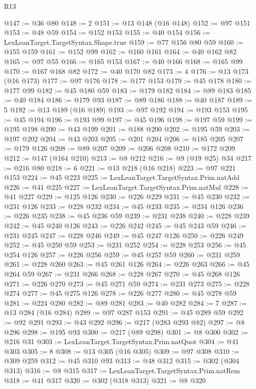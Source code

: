 \begin{lexlean}{R13}
\begin{coremodule}
@147 := @36 @80
@148 := 2
@151 := @13 @148 (@16 @148)
@152 := @97 @151
@153 := @48 @59
@154 := @152 @153
@155 := @40 @154
@156 := LexLeanTarget.TargetSyntax.Shape.true
@159 := @77 @156 @80 @59
@160 := @155 @159
@161 := @152 @99
@162 := @160 @161
@164 := @40 @162 @82
@165 := @97 @55
@166 := @165 @153
@167 := @40 @166
@168 := @165 @99
@170 := @167 @168 @82
@172 := @40 @170 @82
@173 := 4
@176 := @13 @173 (@16 @173)
@177 := @97 @176
@178 := @177 @153
@179 := @45 @178
@180 := @177 @99
@182 := @45 @180 @59
@183 := @179 @182
@184 := @89 @183
@185 := @40 @184
@186 := @179 @93
@187 := @89 @186
@188 := @40 @187
@189 := 5
@192 := @13 @189 (@16 @189)
@193 := @97 @192
@194 := @193 @153
@195 := @45 @194
@196 := @193 @99
@197 := @45 @196
@198 := @197 @59
@199 := @195 @198
@200 := @43 @199
@201 := @188 @200
@202 := @195 @59
@203 := @197 @202
@204 := @43 @203
@205 := @201 @204
@206 := @185 @205
@207 := @179 @126
@208 := @89 @207
@209 := @206 @208
@210 := @172 @209
@212 := @147 (@164 @210)
@213 := @8 @212
@216 := @9 (@19 @25) @34
@217 := @216 @80
@218 := 6
@221 := @13 @218 (@16 @218)
@223 := @97 @221 @153
@224 := @45 @223
@225 := LexLeanTarget.TargetSyntax.Prim.natAdd
@226 := @41 @225
@227 := LexLeanTarget.TargetSyntax.Prim.natMul
@228 := @41 @227
@229 := @125 @126
@230 := @226 @229
@231 := @45 @230
@232 := @231 @126
@233 := @228 @232
@234 := @45 @233
@235 := @234 @126
@236 := @226 @235
@238 := @45 @236 @59
@239 := @231 @238
@240 := @228 @239
@242 := @45 @240 @126
@243 := @226 @242
@245 := @45 @243 @59
@246 := @231 @245
@247 := @228 @246
@249 := @45 @247 @126
@250 := @226 @249
@252 := @45 @250 @59
@253 := @231 @252
@254 := @228 @253
@256 := @45 @254 @126
@257 := @226 @256
@259 := @45 @257 @59
@260 := @231 @259
@261 := @228 @260
@263 := @45 @261 @126
@264 := @226 @263
@266 := @45 @264 @59
@267 := @231 @266
@268 := @228 @267
@270 := @45 @268 @126
@271 := @226 @270
@273 := @45 @271 @59
@274 := @231 @273
@275 := @228 @274
@277 := @45 @275 @126
@278 := @226 @277
@280 := @45 @278 @59
@281 := @224 @280
@282 := @89 @281
@283 := @40 @282
@284 := 7
@287 := @13 @284 (@16 @284)
@289 := @97 @287 @153
@291 := @45 @289 @59
@292 := @92 @291
@293 := @43 @292
@296 := @217 (@283 @293 @82)
@297 := @8 @296
@298 := @195 @93
@300 := @217 (@89 @298)
@301 := @8 @300
@302 := @216 @31
@303 := LexLeanTarget.TargetSyntax.Prim.natQuot
@304 := @41 @303
@305 := 8
@308 := @13 @305 (@16 @305)
@309 := @97 @308
@310 := @309 @259
@312 := @45 @310 @93
@313 := @48 @312
@315 := @302 (@304 @313)
@316 := @8 @315
@317 := LexLeanTarget.TargetSyntax.Prim.natRem
@318 := @41 @317
@320 := @302 (@318 @313)
@321 := @8 @320

\end{coremodule}
\end{lexlean}

